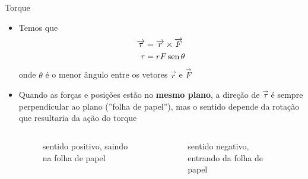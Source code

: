 \begin{frame}{Torque}
    \begin{itemize}
        \item Temos que
            \begin{align*}
                \overrightarrow{\tau} &= \overrightarrow{r} \times \overrightarrow{F} \\
                \tau &= r F \operatorname{sen}{\theta}
            \end{align*}
            onde \(\theta\) é o menor ângulo entre os vetores \(\vec{r}\) e \(\vec{F}\)
        \item Quando as forças e posições estão no \textbf{mesmo plano},
            a direção de \(\vec{\tau}\) é sempre perpendicular ao plano (''folha de papel''), mas o sentido depende da
            rotação que resultaria da ação do torque
            \begin{columns}
                \begin{column}{0.4\textwidth}
                    \begin{figure}
                        \caption{sentido positivo, saindo na folha de papel}
                    \end{figure}
                \end{column}

                \begin{column}{0.4\textwidth}
                    \begin{figure}
                        \caption{sentido negativo, entrando da folha de papel}
                    \end{figure}
                \end{column}

            \end{columns}
    \end{itemize}
\end{frame}

